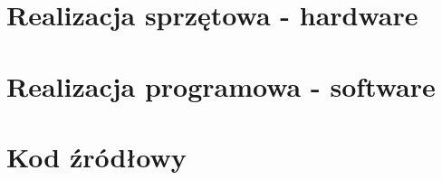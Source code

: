 \documentclass{book}
\begin{document}
\chapter{Realizacja sprzętowa - hardware}




\chapter{Realizacja programowa - software}





\listoffigures
\listoftables

\appendix

\chapter{Kod źródłowy}
\thispagestyle{empty}

\end{document}
